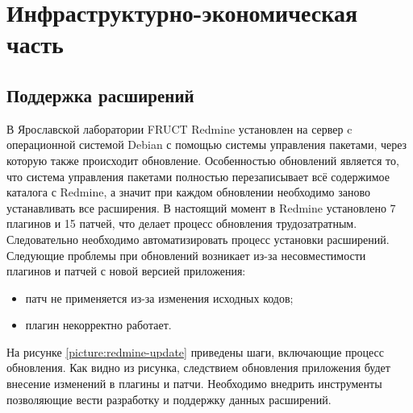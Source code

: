 \chapter{Инфраструктурно-экономическая часть}
\section{Поддержка расширений}
В Ярославской лаборатории FRUCT Redmine установлен на сервер c операционной
системой Debian с помощью системы управления пакетами, через которую также
происходит обновление. Особенностью обновлений является то, что система
управления пакетами полностью перезаписывает всё содержимое каталога с Redmine,
а значит при каждом обновлении необходимо заново устанавливать все расширения.
В настоящий момент в Redmine установлено 7 плагинов и 15 патчей, что делает
процесс обновления трудозатратным. Следовательно необходимо автоматизировать
процесс установки расширений.
Следующие проблемы при обновлений возникает из-за несовместимости плагинов и
патчей с новой версией приложения:
\begin{itemize}
  \item патч не применяется из-за изменения исходных кодов;
  \item плагин некорректно работает.
\end{itemize}
На рисунке \ref{picture:redmine-update} приведены шаги, включающие процесс
обновления. Как видно из рисунка, следствием обновления приложения будет
внесение изменений в плагины и патчи. Необходимо внедрить инструменты
позволяющие вести разработку и поддержку данных расширений.

